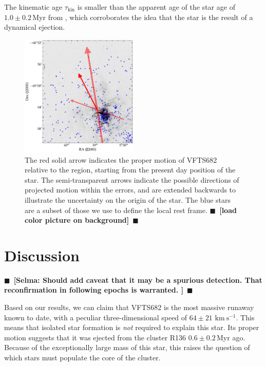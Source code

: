 \documentclass[apjl,twocolumn]{emulateapj}
\newcommand{\todo}[1]{{\large $\blacksquare$~\textbf{\color{red}[#1]}}~$\blacksquare$}
\newcommand{\kms}{{\,\mathrm{km\ s^{-1}}}}
\begin{document}
The kinematic age $\tau_\mathrm{kin}$ is smaller than the apparent age
of the star age of $1.0\pm 0.2$\,Myr from \cite{schneider:18}, which
corroborates the idea that the star is the result of a dynamical
ejection. 

\begin{figure}[htbp]
  \centering
  \includegraphics[width=0.5\textwidth]{./figures/main_plot}  
  \caption{The red solid arrow indicates the proper motion of VFTS682
    relative to the region, starting from the present day position of
    the star. The semi-transparent arrows indicate the possible
    directions of projected motion within the errors, and are extended
    backwards to illustrate the uncertainty on the origin of the
    star. The blue stars
    are a subset of those we use to define the local rest frame. \todo{load color picture on background}}
  \label{fig:main}
\end{figure}

\section{Discussion}
\label{sec:discussion}
\todo{Selma: Should add caveat that it may be a spurious detection.  That reconfirmation in following epochs is warranted. }

Based on our results, we can claim that VFTS682 is the most massive
runaway known to date, with a peculiar three-dimensional speed of $64\pm21\,\kms$. This means that isolated star formation is
\emph{not} required to explain this star. Its proper motion suggests that it was ejected from the cluster R136
$0.6\pm0.2$\,Myr ago. Because of the exceptionally large mass
of this star, this raises the question of which stars must populate
the core of the cluster.
\end{document}
